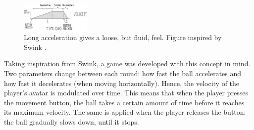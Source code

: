 \begin{figure}[htbp]
\centering
\includegraphics[width=0.30\textwidth]{Pics/adsr_loose}
\caption{Long acceleration gives a loose, but fluid, feel. Figure inspired by Swink \cite{swink}.}
\label{fig:adsr_loose}
\end{figure}

Taking inspiration from Swink, a game was developed with this concept in mind. Two parameters change between each round: how fast the ball accelerates and how fast it decelerates (when moving horizontally). Hence, the velocity of the player's avatar is modulated over time. This means that when the player presses the movement button, the ball takes a certain amount of time before it reaches its maximum velocity. The same is applied when the player releases the button: the ball gradually slows down, until it stops.



